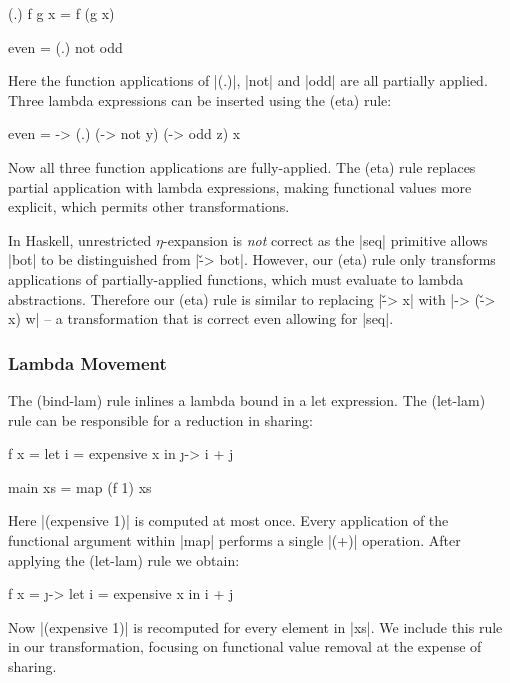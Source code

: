 \documentclass{sigplanconf}
\begin{document}
\begin{example}
\ignore\begin{code}
(.) f g x = f (g x)

even = (.) not odd
\end{code}

\noindent Here the function applications of |(.)|, |not| and |odd| are all partially applied. Three lambda expressions can be inserted using the (eta) rule:

\begin{code}
even = \x -> (.) (\y -> not y) (\z -> odd z) x
\end{code}

\noindent Now all three function applications are fully-applied. The (eta) rule replaces partial application with lambda expressions, making functional values more explicit, which permits other transformations.
\end{example}

In Haskell, unrestricted $\eta$-expansion is \textit{not} correct as the |seq| primitive allows |bot| to be distinguished from |\v -> bot|. However, our (eta) rule only transforms applications of partially-applied functions, which must evaluate to lambda abstractions. Therefore our (eta) rule is similar to replacing |\v -> x| with |\w -> (\v -> x) w| -- a transformation that is correct even allowing for |seq|.

\subsubsection{Lambda Movement}
\label{sec:sharing}

The (bind-lam) rule inlines a lambda bound in a let expression. The (let-lam) rule can be responsible for a reduction in sharing:

\begin{example}
\begin{code}
f x =  let  i = expensive x
       in   \j -> i + j

main xs = map (f 1) xs
\end{code}

\noindent Here |(expensive 1)| is computed at most once. Every application of the functional argument within |map| performs a single |(+)| operation. After applying the (let-lam) rule we obtain:

\begin{code}
f x =  \j ->  let  i = expensive x
              in   i + j
\end{code}

\noindent Now |(expensive 1)| is recomputed for every element in |xs|. We include this rule in our transformation, focusing on functional value removal at the expense of sharing.
\end{example}
\end{document}
